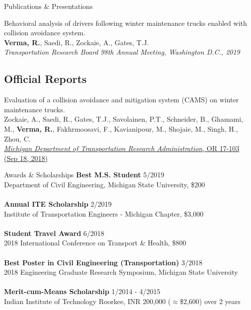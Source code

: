 \documentclass{resume} %
\begin{document}
\begin{rSection}{Publications \& Presentations}
\begin{etaremune}
        \item Behavioral analysis of drivers following winter maintenance trucks enabled with collision avoidance system.
        \\ \textbf{Verma, R.}, Saedi, R., Zockaie, A., Gates, T.J.
        \\ \textit{Transportation Research Board 98th Annual Meeting, Washington D.C., 2019}
    \end{etaremune}
    
    \subsection*{Official Reports}
    \begin{etaremune}
        \item Evaluation of a collision avoidance and mitigation system (CAMS) on winter maintenance trucks.
        \\ Zockaie, A., Saedi, R., Gates, T.J., Savolainen, P.T., Schneider, B., Ghamami, M., \textbf{Verma, R.}, Fakhrmoosavi, F., Kavianipour, M., Shojaie, M., Singh, H., Zhou, C.
        \\ \href{https://rosap.ntl.bts.gov/view/dot/42752}{\textit{Michigan Department of Transportation Research Administration}, OR 17-103 (Sep 18, 2018)}
    \end{etaremune}
    
\end{rSection}

\begin{rSection}{Awards \& Scholarships}
    \textbf{Best M.S. Student} \hfill {5/2019}
    \\ Department of Civil Engineering, Michigan State University, \$200 \\
    \\ \textbf{Annual ITE Scholarship} \hfill {2/2019}
    \\ Institute of Transportation Engineers - Michigan Chapter, \$3,000 \\
    \\ \textbf{Student Travel Award} \hfill {6/2018}
    \\ 2018 International Conference on Transport \& Health, \$800 \\
    \\ \textbf{Best Poster in Civil Engineering (Transportation)} \hfill{3/2018}
    \\ 2018 Engineering Graduate Research Symposium, Michigan State University \\
    \\ \textbf{Merit-cum-Means Scholarship} \hfill{1/2014 - 4/2015}
    \\ Indian Institute of Technology Roorkee, INR 200,000 ($\approx$\$2,600) over 2 years
\end{rSection}
\end{document}

